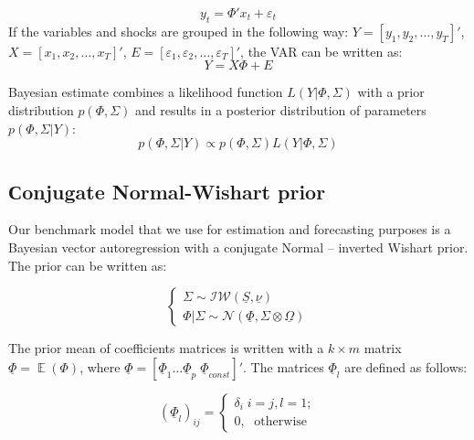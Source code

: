 \documentclass[11pt]{article} %
\DeclareMathOperator{\E}{\mathbb{E}}
\newcommand{\cN}{\mathcal{N}}
\newcommand{\cIW}{\mathcal{IW}}
\newcommand{\prior}{\underline}
\let\vec\relax
\DeclareMathOperator{\vec}{vec}
\begin{document}
\begin{equation}
y_t=\Phi' x_t+\varepsilon_t
\end{equation}
If the variables and shocks are grouped in the following way: $Y=[y_1, y_2,\ldots, y_T]'$, $X=[x_1, x_2,\ldots, x_T]'$, $E=[\varepsilon_1, \varepsilon_2,\ldots, \varepsilon_T]'$, the VAR can be written as:
\begin{equation}
Y=X\Phi+E\label{var}
\end{equation}


Bayesian estimate combines a likelihood function $L(Y|\Phi, \Sigma)$ with a prior distribution $p(\Phi, \Sigma)$ and results in a posterior distribution of parameters $p(\Phi, \Sigma|Y)$: %
\begin{equation}
p(\Phi, \Sigma|Y)\propto p(\Phi,\Sigma) L(Y|\Phi,\Sigma)
\end{equation}


\subsection{Сonjugate Normal-Wishart prior}

Our benchmark model that we use for estimation and forecasting purposes is a Bayesian vector autoregression with a conjugate Normal -- inverted Wishart prior.  The prior can be written as: 

\begin{equation}
\begin{cases} \label{conjugate_prior}
\Sigma\sim \cIW(\prior S, \prior \nu) \\
\Phi|\Sigma\sim \cN (\prior \Phi, \Sigma\otimes\prior \Omega)
\end{cases} 
\end{equation}

The prior mean of coefficients matrices is  written with a $k\times m$ matrix  $\prior \Phi = \E (\Phi)$, where $\prior\Phi=[\prior\Phi_1 \ldots \prior\Phi_p \; \prior\Phi_{const}]'$.%
The matrices $\prior\Phi_l$ are defined as follows:


\begin{equation}
(\prior\Phi_l)_{ij}=
\begin{cases}
\delta_i\; i=j, l=1;\\
0,\;\text{ otherwise }
\end{cases}\label{minnesota_exp}
\end{equation}
\end{document}
